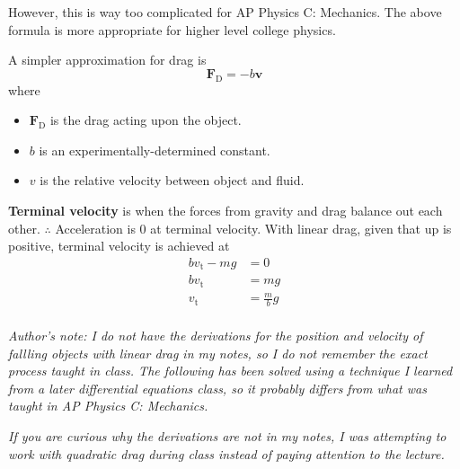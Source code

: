 \documentclass[a4paper, titlepage]{book}
\begin{document}
However, this is way too complicated for AP Physics C: Mechanics.
The above formula is more appropriate for higher level college physics.

A simpler approximation for drag is
\begin{equation}
    \bm{F_\mathrm{D}} = -b \bm{v}
\end{equation}
where
\begin{itemize}
    \item \(\bm{F}_\mathrm{D}\) is the drag acting upon the object.
    \item \(b\) is an experimentally-determined constant.
    \item \(v\) is the relative velocity between object and fluid.
\end{itemize}

\textbf{Terminal velocity} is when the forces from gravity and drag
balance out each other.
\(\therefore\) Acceleration is 0 at terminal velocity.
With linear drag, given that up is positive, terminal velocity is achieved at
\begin{equation} \label{eq:linear-terminal-velocity}
    \begin{aligned}
        bv_\mathrm{t} - mg &= 0 \\
        bv_\mathrm{t} &= mg \\
        v_\mathrm{t} &= \frac{m}{b} g \\
    \end{aligned}
\end{equation}

\textit{
    Author's note:
    I do not have the derivations
    for the position and velocity of fallling objects with linear drag in my notes,
    so I do not remember the exact process taught in class.
    The following has been solved
    using a technique I learned from a later differential equations class,
    so it probably differs from what was taught in AP Physics C: Mechanics.
}

\textit{
    If you are curious why the derivations are not in my notes,
    I was attempting to work with quadratic drag during class
    instead of paying attention to the lecture.
}
\end{document}
